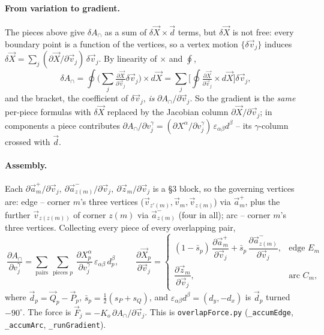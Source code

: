 \documentclass[11pt]{article}
\newcommand{\vv}[1]{\vec{#1}}
\newcommand{\half}{\tfrac{1}{2}}
\begin{document}
\paragraph{From variation to gradient.} The pieces above give $\delta A_{\cap}$ as a sum of
$\delta\vv X\times\vv d$ terms, but $\delta\vv X$ is not free: every boundary point is a function of
the vertices, so a vertex motion $\{\delta\vv v_j\}$ induces $\delta\vv X=\sum_j(\partial\vv
X/\partial\vv v_j)\,\delta\vv v_j$. By linearity of $\times$ and $\oint$,
\[
  \delta A_{\cap}=\oint\Big(\sum_j\tfrac{\partial\vv X}{\partial\vv v_j}\delta\vv v_j\Big)\times d\vv X
  =\sum_j\Big[\oint\tfrac{\partial\vv X}{\partial\vv v_j}\times d\vv X\Big]\delta\vv v_j,
\]
and the bracket, the coefficient of $\delta\vv v_j$, \emph{is} $\partial A_{\cap}/\partial\vv v_j$.
So the gradient is the \emph{same} per-piece formulas with $\delta\vv X$ replaced by the Jacobian
column $\partial\vv X/\partial\vv v_j$; in components a piece contributes $\partial
A_{\cap}/\partial v_j^{\gamma}=(\partial X^{\alpha}/\partial v_j^{\gamma})\,\varepsilon_{\alpha\beta}
d^{\beta}$ -- its $\gamma$-column crossed with $\vv d$.

\paragraph{Assembly.} Each $\partial\vv a^{+}_m/\partial\vv v_j,\ \partial\vv a^{-}_{z(m)}/\partial\vv
v_j,\ \partial\vv z_m/\partial\vv v_j$ is a \S3 block, so the governing vertices are: edge -- corner
$m$'s three vertices ($\vv v_{z'(m)},\vv v_m,\vv v_{z(m)}$) via $\vv a^{+}_m$, plus the further $\vv
v_{z(z(m))}$ of corner $z(m)$ via $\vv a^{-}_{z(m)}$ (four in all); arc -- corner $m$'s three
vertices. Collecting every piece of every overlapping pair,
\[
  \boxed{\ \frac{\partial A_{\cap}}{\partial v_j^{\gamma}}
  =\sum_{\text{pairs}}\ \sum_{\text{pieces }p}\ \frac{\partial X_p^{\alpha}}{\partial v_j^{\gamma}}\,\varepsilon_{\alpha\beta}\,d_p^{\beta},
  \qquad
  \frac{\partial\vv X_p}{\partial\vv v_j}=
  \begin{cases}
    (1-\bar s_p)\,\dfrac{\partial\vv a^{+}_{m}}{\partial\vv v_j}+\bar s_p\,\dfrac{\partial\vv a^{-}_{z(m)}}{\partial\vv v_j}, & \text{edge }E_m\\[10pt]
    \dfrac{\partial\vv z_m}{\partial\vv v_j}, & \text{arc }C_m,
  \end{cases}\ }
\]
where $\vv d_p=\vv Q_p-\vv P_p$, $\bar s_p=\half(s_P+s_Q)$, and
$\varepsilon_{\alpha\beta}d^{\beta}=(d_y,-d_x)$ is $\vv d_p$ turned $-90^\circ$. The force is $\vv
F_j=-K_o\,\partial A_{\cap}/\partial\vv v_j$. This is \texttt{overlapForce.py}
(\texttt{\_accumEdge}, \texttt{\_accumArc}, \texttt{\_runGradient}).
\end{document}
